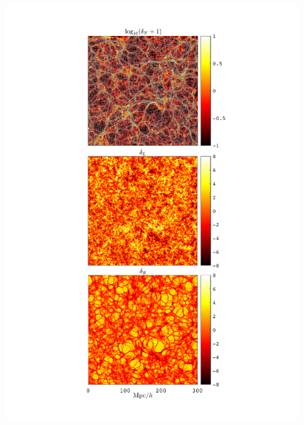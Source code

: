 \documentclass[aps,prd,twocolumn,superscriptaddress,amsfont,amssymb,amsmath,nofootinbib,showpacs,balancelastpage]{revtex4-1}
\begin{document}
\maketitle
\begin{figure}
 \centering
  \includegraphics[width=0.99\linewidth]{denx3.pdf}
  \caption{}
  \label{fig.1}
\end{figure}
\end{document}
